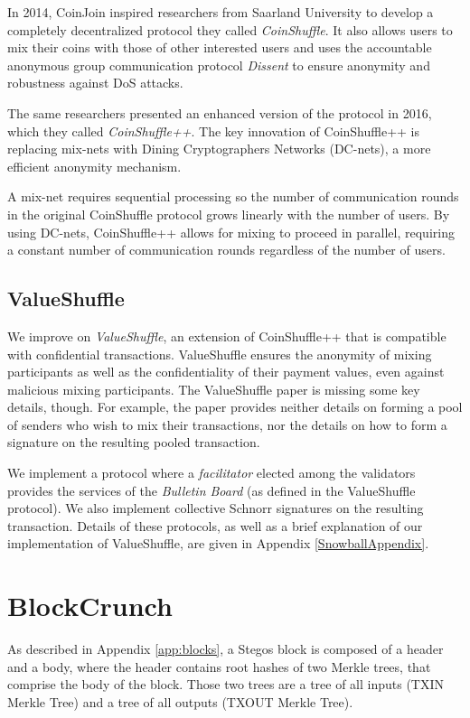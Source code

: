 \documentclass[8pt,fleqn,openany]{book}
\begin{document}
In 2014, CoinJoin inspired researchers from Saarland University to develop a completely decentralized protocol they called \textit{CoinShuffle}\cite{c17}. It also allows users to mix their coins with those of other interested users and uses the accountable anonymous group communication protocol \textit{Dissent} to ensure anonymity and robustness against DoS attacks. 

The same researchers presented an enhanced version of the protocol in 2016, which they called \textit{CoinShuffle++}\cite{c18}. The key innovation of CoinShuffle++ is replacing mix-nets with Dining Cryptographers Networks (DC-nets)\cite{c20}, a more efficient anonymity mechanism. 

A mix-net requires sequential processing so the number of communication rounds in the original CoinShuffle protocol grows linearly with the number of users. By using DC-nets, CoinShuffle++ allows for mixing to proceed in parallel, requiring a constant number of communication rounds regardless of the number of users. 

\subsection{ValueShuffle}
We improve on \textit{ValueShuffle}\cite{c19}, an extension of CoinShuffle++ that is compatible with confidential transactions. ValueShuffle ensures the anonymity of mixing participants as well as the confidentiality of their payment values, even against malicious mixing participants. The ValueShuffle paper is missing some key details, though. For example, the paper provides neither details on forming a pool of senders who wish to mix their transactions, nor the details on how to form a signature on the resulting pooled transaction. 

We implement a protocol where a \textit{facilitator} elected among the validators provides the services of the \textit{Bulletin Board} (as defined in the ValueShuffle protocol). We also implement collective Schnorr signatures\cite{c22} on the resulting transaction. Details of these protocols, as well as a brief explanation of our implementation of ValueShuffle, are given in Appendix \ref{SnowballAppendix}.

\section{BlockCrunch}

As described in Appendix \ref{app:blocks}, a Stegos block is composed of a header and a body, where the header contains root hashes of two Merkle trees, that comprise the body of the block. Those two trees are a tree of all inputs (TXIN Merkle Tree) and a tree of all outputs (TXOUT Merkle Tree). 
\end{document}

